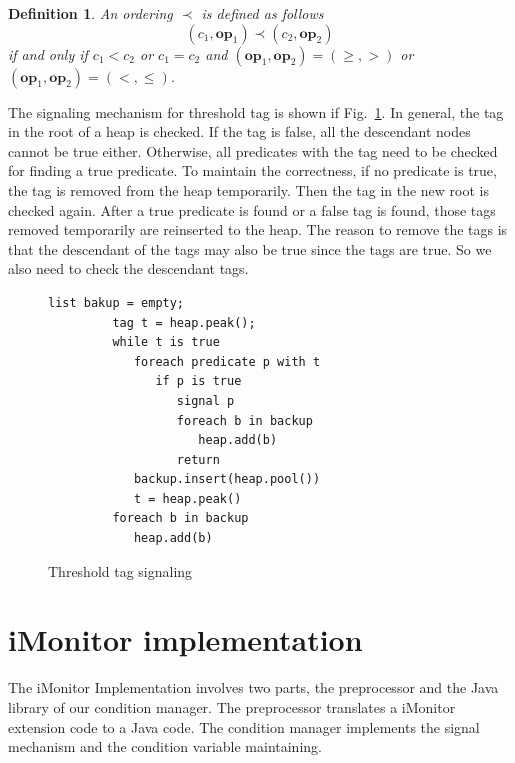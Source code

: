\documentclass[preprint]{sigplanconf}
\newtheorem{definition}{Definition}
\begin{document}
\begin{definition} \label{def:th_order}
    An ordering $\prec$ is defined as follows
\[
   (c_1, \boldsymbol{op}_1) \prec (c_2, \boldsymbol{op}_2)
\]
if and only if $c_1 < c_2$ or $c_1 = c_2$ and $(\boldsymbol{op}_1,
\boldsymbol{op}_2)  = (\ge, >)$ or $(\boldsymbol{op}_1, \boldsymbol{op}_2) =
(<, \le)$. 
\end{definition}

The signaling mechanism for threshold tag is shown if Fig.~\ref{fig:th_sig}. In
general, the tag in the root of a heap is checked. If the tag is false, all the
descendant nodes cannot be true either. Otherwise, all predicates with the tag
need to be checked for finding a true predicate. To maintain the correctness, 
if no predicate is true, the tag is removed from the heap temporarily. Then the
tag in the new root is checked again. After a true predicate is found or a
false tag is found, those tags removed temporarily are reinserted to the heap.
The reason to remove the tags is that the descendant of the tags may also be
true since the tags are true. So we also need to check the descendant tags.
\begin{figure}[ht!]
    \begin{Verbatim}[fontsize=\footnotesize,gobble=8,frame=lines,
            framesep=3mm]
         list bakup = empty;
         tag t = heap.peak();
         while t is true
            foreach predicate p with t
               if p is true
                  signal p
                  foreach b in backup 
                     heap.add(b)
                  return
            backup.insert(heap.pool())
            t = heap.peak()
         foreach b in backup 
            heap.add(b)
    \end{Verbatim}
  \caption{Threshold tag signaling}
  \label{fig:th_sig}
\end{figure}




\section{iMonitor implementation} \label{sec:imp}
The iMonitor Implementation involves two parts, the preprocessor and the Java
library of our condition manager. 
The preprocessor translates a iMonitor extension code to a Java code.
The condition manager implements the signal mechanism and the condition
variable maintaining. 
\end{document}
